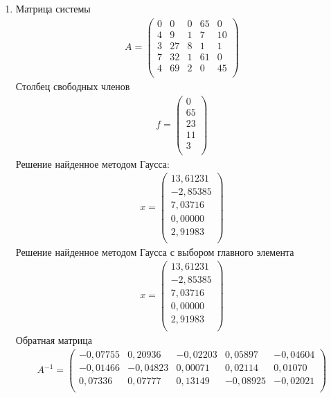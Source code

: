 \documentclass[a4paper,12pt,titlepage,finall]{article}
\begin{document}
\begin{enumerate}
\item
Матрица системы
\begin{align*}
A = \begin{pmatrix}
0&     0&     0&    65&     0 \\
   4&     9&     1&     7&    10 \\
   3&    27&     8&     1&     1 \\
   7&    32&     1&    61&     0 \\
   4&    69&     2&     0&    45 \\
\end{pmatrix}
\end{align*}
Столбец свободных членов
\begin{align*}
f = \begin{pmatrix}
   0 \\
  65 \\
  23 \\
  11 \\
   3 \\
\end{pmatrix}
\end{align*}
Решение найденное методом Гаусса:
\begin{align*}
x = \begin{pmatrix}
13,61231 \\
  -2,85385 \\
   7,03716 \\
   0,00000 \\
   2,91983 \\
\end{pmatrix}
\end{align*}
Решение найденное методом Гаусса с выбором главного элемента
\begin{align*}
x = \begin{pmatrix}
  13,61231 \\
  -2,85385 \\
   7,03716 \\
   0,00000 \\
   2,91983 \\
\end{pmatrix}
\end{align*}
Обратная матрица
\begin{align*}
A^{-1} = \begin{pmatrix}
  -0,07755&     0,20936&    -0,02203&     0,05897&    -0,04604 \\
  -0,01466&    -0,04823&     0,00071&     0,02114&     0,01070 \\
   0,07336&     0,07777&     0,13149&    -0,08925&    -0,02021 \\

\end{pmatrix}
\end{align*}
\end{enumerate}
\end{document}
